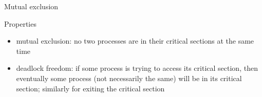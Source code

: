 \documentclass{beamer}
\def\dgold#1{{\darkgoldenrod #1}}
\def\dkb#1{{\blue #1}}
\begin{document}
%
%
%





%
%
%
%
%




\begin{slide}{Mutual exclusion}
\small

\begin{block}{Properties}
\begin{itemize}
\item \dkb{mutual exclusion}: \dgold{no two processes are in their critical sections at the same time}
\item \dkb{deadlock freedom}: \dgold{if some process is trying to access its critical section, then 
eventually some process (not necessarily the same) will be in its critical section; similarly for exiting the critical section}
\end{itemize}
\end{block}
\end{slide}
\end{document}
